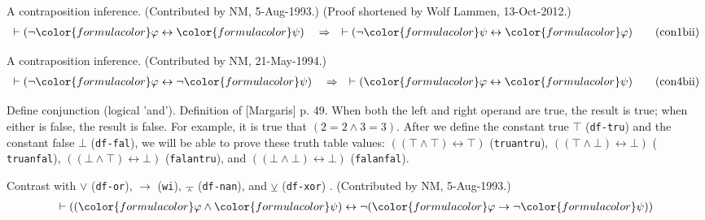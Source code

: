\begin{lemma} A contraposition inference.  (Contributed by
NM, 5-Aug-1993.)  (Proof
       shortened by Wolf Lammen, 13-Oct-2012.)
\begin{align}
\vdash ( \lnot {\color{formulacolor}\varphi} \leftrightarrow
    {\color{formulacolor}\psi} )\quad\Rightarrow\quad \vdash ( \lnot
    {\color{formulacolor}\psi} \leftrightarrow {\color{formulacolor}\varphi}
    )\label{eq:con1bii}\tag{con1bii}
\end{align}
\end{lemma}


\begin{lemma} A contraposition inference.  (Contributed by
NM, 21-May-1994.)
\begin{align}
\vdash ( \lnot {\color{formulacolor}\varphi} \leftrightarrow \lnot
    {\color{formulacolor}\psi} )\quad\Rightarrow\quad \vdash (
    {\color{formulacolor}\varphi} \leftrightarrow {\color{formulacolor}\psi}
    )\label{eq:con4bii}\tag{con4bii}
\end{align}
\end{lemma}


\begin{lemma} Define conjunction (logical 'and').  Definition
of [Margaris] p. 49.  When
     both the left and right operand are true, the result is true; when either
     is false, the result is false.  For example, it is true that
     $( 2 = 2 \wedge 3 = 3 )$.  After we define the constant true $\top$
     ({\tt df-tru}) and the constant false $\bot$ ({\tt df-fal}), we will be
able
     to prove these truth table values: $( ( \top \wedge \top )
\leftrightarrow \top )$
     ({\tt truantru}), $( ( \top \wedge \bot ) \leftrightarrow \bot )$ ({\tt
truanfal}),
     $( ( \bot \wedge \top ) \leftrightarrow \bot )$ ({\tt falantru}), and
     $( ( \bot \wedge \bot ) \leftrightarrow \bot )$ ({\tt falanfal}).

     Contrast with $\vee$ ({\tt df-or}), $\rightarrow$ ({\tt wi}), $\barwedge$
({\tt df-nan}),
     and $\veebar$ ({\tt df-xor}) .  (Contributed by NM, 5-Aug-1993.)
\begin{align}
\vdash ( ( {\color{formulacolor}\varphi} \wedge {\color{formulacolor}\psi} )
    \leftrightarrow \lnot ( {\color{formulacolor}\varphi} \rightarrow \lnot
    {\color{formulacolor}\psi} ) )\label{eq:df-an}
\end{align}
\end{lemma}


